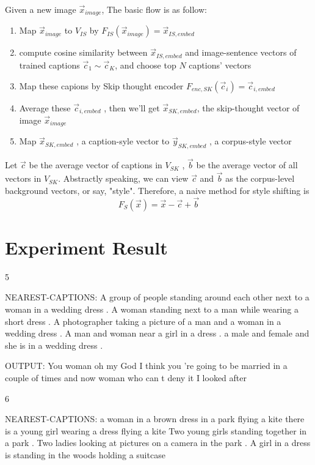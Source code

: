 \documentclass{article}
\begin{document}
	\par Given a new image $\vec{x}_{image}$, The basic flow is as follow:
	\begin{enumerate}
		\item Map $\vec{x}_{image}$ to $V_{IS}$ by $F_{IS}(\vec{x}_{image}) = \vec{x}_{IS,embed}$
		\item compute cosine similarity between $\vec{x}_{IS,embed}$ and image-sentence vectors of trained captions $\vec{c}_1 \sim \vec{c}_K$, and choose top $N$ captions' vectors
		\item Map these capions by Skip thought encoder $F_{enc,SK}(\vec{c}_i) = \vec{c}_{i,embed}$
		\item Average these $\vec{c}_{i,embed}$ , then we'll get $\vec{x}_{SK,embed}$, the skip-thought vector of image $\vec{x}_{image}$
		\item Map $\vec{x}_{SK,embed}$ , a caption-syle vector to $\vec{y}_{SK,embed}$ , a corpus-style vector
	\end{enumerate}

	\par Let $\vec{c}$ be the average vector of captions in $V_{SK}$ , $\vec{b}$ be the average vector of all vectors in $V_{SK}$. Abstractly speaking, we can view $\vec{c}$ and $\vec{b}$ as the corpus-level background vectors, or say, "style". Therefore, a naive method for style shifting is
	\[ F_S(\vec{x}) = \vec{x} - \vec{c} + \vec{b} \]

\section{Experiment Result}

5

NEAREST-CAPTIONS:
A group of people standing around each other next to a woman in a wedding dress .
A woman standing next to a man while wearing a short dress .
A photographer taking a picture of a man and a woman in a wedding dress .
A man and woman near a girl in a dress .
a male and female and she is in a wedding dress .

OUTPUT:
You woman
oh my God
I think you 're going to be married in a couple of times
and now
woman who can t deny it
I looked after 

6

NEAREST-CAPTIONS:
a woman in a brown dress in a park flying a kite
there is a young girl wearing a dress flying a kite
Two young girls standing together in a park .
Two ladies looking at pictures on a camera in the park .
A girl in a dress is standing in the woods holding a suitcase
\end{document}
